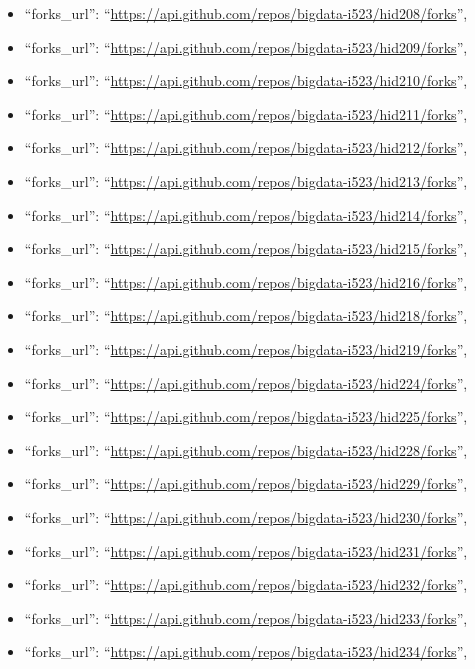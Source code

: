 \begin{itemize}
\item
  ``forks\_url'':
  ``\url{https://api.github.com/repos/bigdata-i523/hid208/forks}'',
\item
  ``forks\_url'':
  ``\url{https://api.github.com/repos/bigdata-i523/hid209/forks}'',
\item
  ``forks\_url'':
  ``\url{https://api.github.com/repos/bigdata-i523/hid210/forks}'',
\item
  ``forks\_url'':
  ``\url{https://api.github.com/repos/bigdata-i523/hid211/forks}'',
\item
  ``forks\_url'':
  ``\url{https://api.github.com/repos/bigdata-i523/hid212/forks}'',
\item
  ``forks\_url'':
  ``\url{https://api.github.com/repos/bigdata-i523/hid213/forks}'',
\item
  ``forks\_url'':
  ``\url{https://api.github.com/repos/bigdata-i523/hid214/forks}'',
\item
  ``forks\_url'':
  ``\url{https://api.github.com/repos/bigdata-i523/hid215/forks}'',
\item
  ``forks\_url'':
  ``\url{https://api.github.com/repos/bigdata-i523/hid216/forks}'',
\item
  ``forks\_url'':
  ``\url{https://api.github.com/repos/bigdata-i523/hid218/forks}'',
\item
  ``forks\_url'':
  ``\url{https://api.github.com/repos/bigdata-i523/hid219/forks}'',
\item
  ``forks\_url'':
  ``\url{https://api.github.com/repos/bigdata-i523/hid224/forks}'',
\item
  ``forks\_url'':
  ``\url{https://api.github.com/repos/bigdata-i523/hid225/forks}'',
\item
  ``forks\_url'':
  ``\url{https://api.github.com/repos/bigdata-i523/hid228/forks}'',
\item
  ``forks\_url'':
  ``\url{https://api.github.com/repos/bigdata-i523/hid229/forks}'',
\item
  ``forks\_url'':
  ``\url{https://api.github.com/repos/bigdata-i523/hid230/forks}'',
\item
  ``forks\_url'':
  ``\url{https://api.github.com/repos/bigdata-i523/hid231/forks}'',
\item
  ``forks\_url'':
  ``\url{https://api.github.com/repos/bigdata-i523/hid232/forks}'',
\item
  ``forks\_url'':
  ``\url{https://api.github.com/repos/bigdata-i523/hid233/forks}'',
\item
  ``forks\_url'':
  ``\url{https://api.github.com/repos/bigdata-i523/hid234/forks}'',

\end{itemize}
